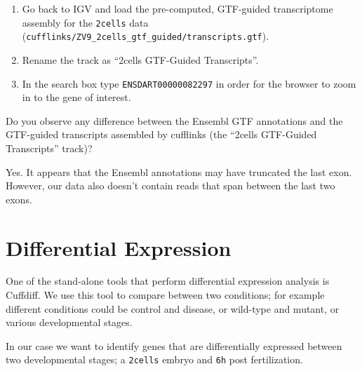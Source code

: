 \begin{steps}
\begin{enumerate}
  \item Go back to IGV and load the pre-computed, GTF-guided transcriptome
  assembly for the \texttt{2cells} data
  (\texttt{cufflinks/ZV9\_2cells\_gtf\_guided/transcripts.gtf}).
  \item Rename the track as ``2cells GTF-Guided Transcripts''.
  \item In the search box type \texttt{ENSDART00000082297} in order for the
  browser to zoom in to the gene of interest.
\end{enumerate}
\end{steps}

\begin{questions}
Do you observe any difference between the Ensembl GTF annotations and the
GTF-guided transcripts assembled by cufflinks (the ``2cells GTF-Guided Transcripts'' track)?
\begin{answer}
Yes. It appears that the Ensembl annotations may have truncated the last exon.
However, our data also doesn't contain reads that span between the last two
exons.
\end{answer}

\end{questions}

\section{Differential Expression}

One of the stand-alone tools that perform differential expression analysis is
Cuffdiff. We use this tool to compare between two conditions; for example
different conditions could be control and disease, or wild-type and mutant, or
various developmental stages.

In our case we want to identify genes that are differentially expressed between
two developmental stages; a \texttt{2cells} embryo and \texttt{6h} post
fertilization.

